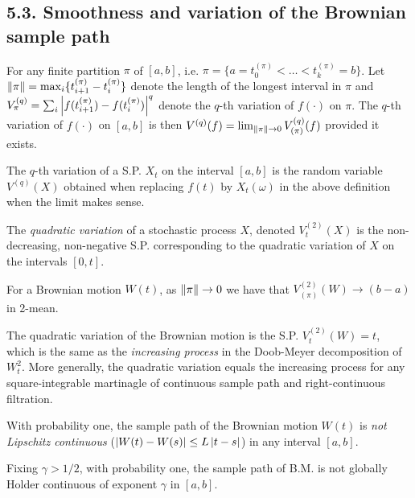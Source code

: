 \subsection*{5.3. Smoothness and variation of the Brownian sample path}

\begin{definition*}
For any finite partition $\pi$ of $[a,b]$, i.e. $\pi=\{a=t_0^{(\pi)} < \dots < t_k^{(\pi)} = b\}$. Let $\left\lVert\pi\right\rVert = \max_i \{ t_{i+1}^{(\pi)} - t_i^{(\pi)}\}$ denote the length of the longest interval in $\pi$ and $V_{\pi}^{(q)} = \sum_i \left\lvert f(t_{i+1}^{(\pi)}) - f(t_i^{(\pi)}) \right\rvert^q$ denote the $q$-th variation of $f(\cdot)$ on $\pi$. The $q$-th variation of $f(\cdot)$ on $[a,b]$ is then $V^{(q)}(f) = \lim_{\left\lVert\pi\right\rVert\to0} V_{(\pi)}^{(q)}(f)$ provided it exists.
\end{definition*}

\begin{definition*}
The $q$-th variation of a S.P. $X_t$ on the interval $[a,b]$ is the random variable $V^{(q)}(X)$ obtained when replacing $f(t)$ by $X_t(\omega)$ in the above definition when the limit makes sense.
\end{definition*}

\begin{definition*}
The \emph{quadratic variation} of a stochastic process $X$, denoted $V_t^{(2)}(X)$ is the non-decreasing, non-negative S.P. corresponding to the quadratic variation of $X$ on the intervals $[0,t]$.
\end{definition*}

\begin{proposition*}
For a Brownian motion $W(t)$, as $\left\lVert\pi\right\rVert\to0$ we have that $V_{(\pi)}^{(2)}(W)\to(b-a)$ in 2-mean.
\end{proposition*}

\begin{corollary*} The quadratic variation of the Brownian motion is the S.P. $V_t^{(2)}(W) = t$, which is the same as the \emph{increasing process} in the Doob-Meyer decomposition of $W_t^2$. More generally, the quadratic variation equals the increasing process for any square-integrable martinagle of continuous sample path and right-continuous filtration.
\end{corollary*}

\begin{corollary*}
With probability one, the sample path of the Brownian motion $W(t)$ is \emph{not Lipschitz continuous} ($\left\lvert W(t)-W(s) \right\rvert\leq L\left\lvert t-s \right\rvert$) in any interval $[a,b]$.
\end{corollary*}

\begin{exercise*}
Fixing $\gamma>1/2$, with probability one, the sample path of B.M. is not globally Holder continuous of exponent $\gamma$ in $[a,b]$.
\end{exercise*}

